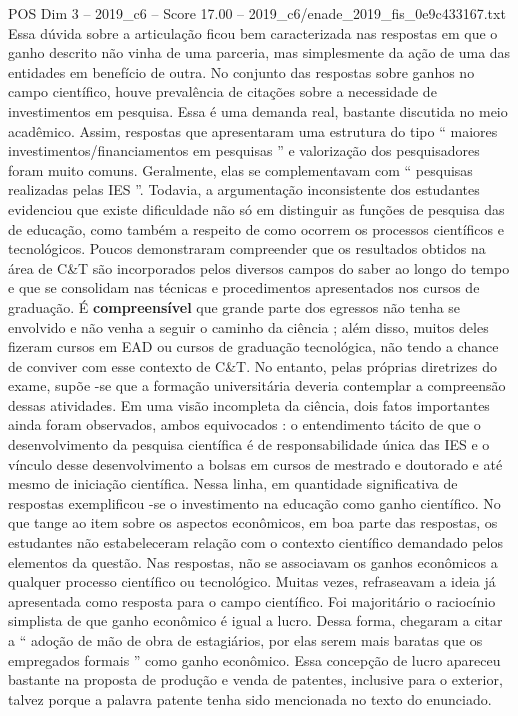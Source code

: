 \begin{textsample}{POS Dim 3 – 2019\_c6 – Score 17.00 – 2019\_c6/enade\_2019\_fis\_0e9c433167.txt}
Essa dúvida sobre a articulação ficou bem caracterizada nas respostas em que o ganho descrito não vinha de uma parceria, mas simplesmente da ação de uma das entidades em benefício de outra.
No conjunto das respostas sobre ganhos no campo científico, houve prevalência de citações sobre a necessidade de investimentos em pesquisa.
Essa é uma demanda real, bastante discutida no meio acadêmico.
Assim, respostas que apresentaram uma estrutura do tipo “ maiores investimentos/financiamentos em pesquisas ” e valorização dos pesquisadores foram muito comuns.
Geralmente, elas se complementavam com “ pesquisas realizadas pelas IES ”.
Todavia, a argumentação inconsistente dos estudantes evidenciou que existe dificuldade não só em distinguir as funções de pesquisa das de educação, como também a respeito de como ocorrem os processos científicos e tecnológicos.
Poucos demonstraram compreender que os resultados obtidos na área de C\&T são incorporados pelos diversos campos do saber ao longo do tempo e que se consolidam nas técnicas e procedimentos apresentados nos cursos de graduação.
É \textbf{compreensível} que grande parte dos egressos não tenha se envolvido e não venha a seguir o caminho da ciência ; além disso, muitos deles fizeram cursos em EAD ou cursos de graduação tecnológica, não tendo a chance de conviver com esse contexto de C\&T.
No entanto, pelas próprias diretrizes do exame, supõe -se que a formação universitária deveria contemplar a compreensão dessas atividades.
Em uma visão incompleta da ciência, dois fatos importantes ainda foram observados, ambos equivocados : o entendimento tácito de que o desenvolvimento da pesquisa científica é de responsabilidade única das IES e o vínculo desse desenvolvimento a bolsas em cursos de mestrado e doutorado e até mesmo de iniciação científica.
Nessa linha, em quantidade significativa de respostas exemplificou -se o investimento na educação como ganho científico.
No que tange ao item sobre os aspectos econômicos, em boa parte das respostas, os estudantes não estabeleceram relação com o contexto científico demandado pelos elementos da questão.
Nas respostas, não se associavam os ganhos econômicos a qualquer processo científico ou tecnológico.
Muitas vezes, refraseavam a ideia já apresentada como resposta para o campo científico.
Foi majoritário o raciocínio simplista de que ganho econômico é igual a lucro.
Dessa forma, chegaram a citar a “ adoção de mão de obra de estagiários, por elas serem mais baratas que os empregados formais ” como ganho econômico.
Essa concepção de lucro apareceu bastante na proposta de produção e venda de patentes, inclusive para o exterior, talvez porque a palavra patente tenha sido mencionada no texto do enunciado.

\end{textsample}
